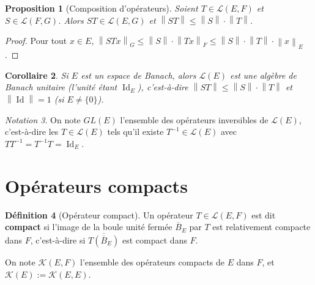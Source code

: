 \documentclass[a4paper,12pt]{book}
\DeclareMathOperator{\Id}{Id}
\newcommand{\norm}[1]{\left\| #1 \right\|}
\theoremstyle{definition}
\newtheorem{definition}{Définition}[chapter]
\theoremstyle{plain}
\newtheorem{proposition}[definition]{Proposition}
\newtheorem{corollaire}[definition]{Corollaire}
\theoremstyle{remark}
\newtheorem{notation}[definition]{Notation}
\begin{document}
\begin{proposition}[Composition d'opérateurs]\label{prop:composition-operateurs}
Soient $T \in \mathcal{L}(E,F)$ et $S \in \mathcal{L}(F,G)$. Alors
$ST \in \mathcal{L}(E,G)$ et $\norm{ST} \leq \norm{S}\cdot\norm{T}$.
\end{proposition}

\begin{proof}
Pour tout $x \in E$, $\norm{STx}_G \leq \norm{S}\cdot\norm{Tx}_F \leq
\norm{S}\cdot\norm{T}\cdot\norm{x}_E$.
\end{proof}

\begin{corollaire}\label{cor:LEE-algebre}
Si $E$ est un espace de Banach, alors $\mathcal{L}(E)$ est une algèbre de Banach
unitaire (l'unité étant $\Id_E$), c'est-à-dire
$\norm{ST} \leq \norm{S}\cdot\norm{T}$ et $\norm{\Id} = 1$ (si $E \neq \{0\}$).
\end{corollaire}

\begin{notation}\label{not:GL-E}
On note $GL(E)$ l'ensemble des opérateurs inversibles de $\mathcal{L}(E)$, c'est-à-dire
les $T \in \mathcal{L}(E)$ tels qu'il existe $T^{-1} \in \mathcal{L}(E)$ avec
$TT^{-1} = T^{-1}T = \Id_E$.
\end{notation}


\section{Opérateurs compacts}
\label{sec:operateurs-compacts}


\begin{definition}[Opérateur compact]\label{def:operateur-compact}
Un opérateur $T \in \mathcal{L}(E,F)$ est dit \textbf{compact} si l'image de la boule
unité fermée $\overline{B}_E$ par $T$ est relativement compacte dans $F$, c'est-à-dire
si $\overline{T(\overline{B}_E)}$ est compact dans $F$.

On note $\mathcal{K}(E,F)$ l'ensemble des opérateurs
compacts de $E$ dans $F$, et $\mathcal{K}(E) := \mathcal{K}(E,E)$.
\end{definition}
\end{document}
